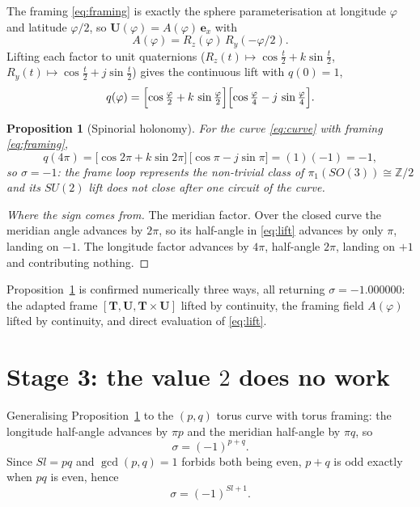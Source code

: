 \documentclass[11pt,a4paper]{article}
\newtheorem{proposition}{Proposition}
\begin{document}
The framing \eqref{eq:framing} is exactly the sphere parameterisation at
longitude $\varphi$ and latitude $\varphi/2$, so
$\bm{U}(\varphi) = A(\varphi)\,\bm{e}_x$ with
\begin{equation}
A(\varphi) = R_z(\varphi)\, R_y(-\varphi/2).
\end{equation}
Lifting each factor to unit quaternions
($R_z(t)\mapsto \cos\tfrac{t}{2} + k\sin\tfrac{t}{2}$,
 $R_y(t)\mapsto \cos\tfrac{t}{2} + j\sin\tfrac{t}{2}$) gives the
continuous lift with $q(0)=1$,
\begin{equation}
\label{eq:lift}
q(\varphi) =
\Bigl[\cos\tfrac{\varphi}{2} + k\,\sin\tfrac{\varphi}{2}\Bigr]
\Bigl[\cos\tfrac{\varphi}{4} - j\,\sin\tfrac{\varphi}{4}\Bigr].
\end{equation}

\begin{proposition}[Spinorial holonomy]
\label{prop:spinorial}
For the curve \eqref{eq:curve} with framing \eqref{eq:framing},
\[
q(4\pi) = \bigl[\cos 2\pi + k \sin 2\pi\bigr]\,
          \bigl[\cos \pi - j \sin \pi\bigr]
        = (1)(-1) = -1 ,
\]
so $\sigma = -1$: the frame loop represents the non-trivial class of
$\pi_1(SO(3)) \cong \mathbb{Z}/2$ and its $SU(2)$ lift does not close
after one circuit of the curve.
\end{proposition}

\begin{proof}[Where the sign comes from]
The meridian factor.  Over the closed curve the meridian angle advances
by $2\pi$, so its half-angle in \eqref{eq:lift} advances by only $\pi$,
landing on $-1$.  The longitude factor advances by $4\pi$, half-angle
$2\pi$, landing on $+1$ and contributing nothing.
\end{proof}

Proposition~\ref{prop:spinorial} is confirmed numerically three ways, all
returning $\sigma = -1.000000$: the adapted frame $[\bm{T},\bm{U},
\bm{T}\times\bm{U}]$ lifted by continuity, the framing field $A(\varphi)$
lifted by continuity, and direct evaluation of \eqref{eq:lift}.

\section{Stage 3: the value $2$ does no work}

Generalising Proposition~\ref{prop:spinorial} to the $(p,q)$ torus curve
with torus framing: the longitude half-angle advances by $\pi p$ and the
meridian half-angle by $\pi q$, so
\begin{equation}
\label{eq:parity}
\sigma = (-1)^{p+q}.
\end{equation}
Since $Sl = pq$ and $\gcd(p,q)=1$ forbids both being even, $p+q$ is odd
exactly when $pq$ is even, hence
\begin{equation}
\label{eq:parity2}
\sigma = (-1)^{Sl+1}.
\end{equation}
\end{document}
